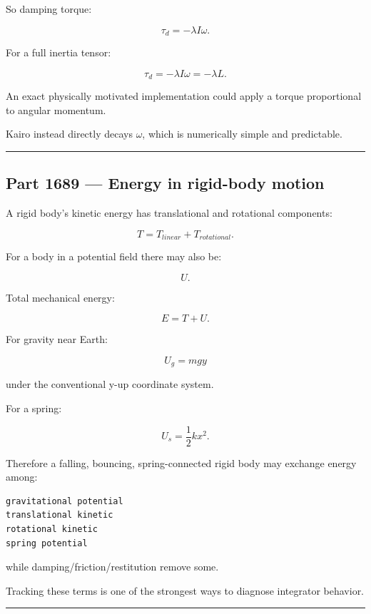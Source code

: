 So damping torque:

\[
\boxed{
\tau_d
=
-\lambda I\omega.
}
\]

For a full inertia tensor:

\[
\tau_d
=
-\lambda I\omega
=
-\lambda L.
\]

An exact physically motivated implementation could apply a torque proportional to angular momentum.

Kairo instead directly decays \(\omega\), which is numerically simple and predictable.

\begin{center}\rule{0.5\linewidth}{0.5pt}\end{center}

\subsection{Part 1689 --- Energy in rigid-body motion}\label{06-engine-ii-ch039-part-1689-energy-in-rigid-body-motion}

A rigid body's kinetic energy has translational and rotational components:

\[
\boxed{
T
=
T_{linear}
+
T_{rotational}.
}
\]

For a body in a potential field there may also be:

\[
U.
\]

Total mechanical energy:

\[
\boxed{
E=T+U.
}
\]

For gravity near Earth:

\[
U_g
=
mgy
\]

under the conventional y-up coordinate system.

For a spring:

\[
U_s
=
\frac12kx^2.
\]

Therefore a falling, bouncing, spring-connected rigid body may exchange energy among:

\begin{verbatim}
gravitational potential
translational kinetic
rotational kinetic
spring potential
\end{verbatim}

while damping/friction/restitution remove some.

Tracking these terms is one of the strongest ways to diagnose integrator behavior.

\begin{center}\rule{0.5\linewidth}{0.5pt}\end{center}

